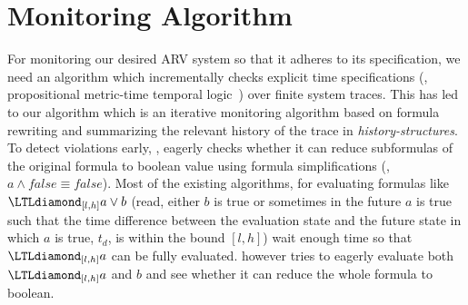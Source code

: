 
\section{Monitoring Algorithm}

For 
monitoring our desired ARV system so that it adheres to its specification, 
we need an algorithm which %
incrementally checks explicit time specifications (\ie, propositional metric-time temporal logic~\cite{Koymans1990}) over finite system traces. 
This has led to our algorithm \monitor which is an iterative monitoring algorithm based on formula rewriting and summarizing the relevant history of the trace 
in \emph{history-structures}. To detect violations early, \monitor, eagerly checks whether it can reduce subformulas of the original formula to boolean value 
using formula simplifications (\eg, $a\wedge \mathit{false} \equiv \mathit{false}$). Most of the existing algorithms, for evaluating  formulas like $\eventually_{[l,h]} a \vee b$ (read, 
either $b$ is true or sometimes in the future $a$ is true such that the time difference between the evaluation state and the future state in which $a$ is true, $t_d$, is within the bound $[l,h]$) wait 
enough time so that $\eventually_{[l,h]} a$ can be fully evaluated. \monitor however tries to eagerly evaluate both $\eventually_{[l,h]} a$ and $b$ and see whether it can 
reduce the whole formula to boolean.
%

